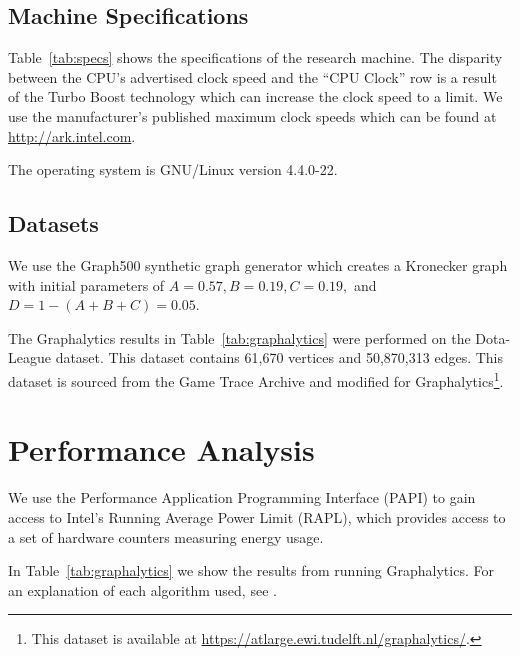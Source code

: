 \documentclass{llncs}
\begin{document}
\subsection{Machine Specifications}
Table~\ref{tab:specs} shows the specifications of the research machine. The disparity between the CPU's advertised clock speed and the ``CPU Clock'' row is a result of the Turbo Boost technology which can increase the clock speed to a limit. We use the manufacturer's published maximum clock speeds which can be found at \url{http://ark.intel.com}.

\begin{table}
	\centering
	\caption{The operating system is GNU/Linux version 4.4.0-22.}
	\label{tab:specs}
\end{table}

\subsection{Datasets}
We use the Graph500 synthetic graph generator which creates a Kronecker graph \cite{Leskovec:2010:Kronecker} with initial parameters of $A = 0.57, B = 0.19, C = 0.19,$ and $D = 1-(A+B+C) = 0.05$.

The Graphalytics results in Table~\ref{tab:graphalytics} were performed on the Dota-League dataset. This dataset contains 61,670 vertices and 50,870,313 edges. This dataset is sourced from the Game Trace Archive\cite{Guo:2012:GTA} and modified for Graphalytics\footnote{This dataset is available at \url{https://atlarge.ewi.tudelft.nl/graphalytics/}.}.

\section{Performance Analysis}

We use the Performance Application Programming Interface (PAPI) \cite{Browne:2000:PAPI} to gain access to Intel's Running Average Power Limit (RAPL), which provides access to a set of hardware counters measuring energy usage.


In Table~\ref{tab:graphalytics} we show the results from running Graphalytics. For an explanation of each algorithm used, see \cite{Iosup:2016:Graphalyticstech}.
\end{document}
